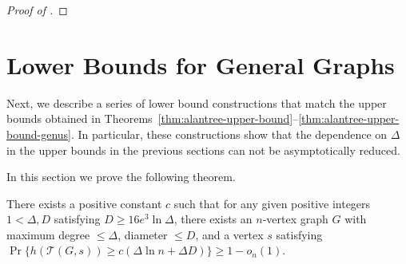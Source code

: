 \documentclass{patmorin}
\newcommand{\tcal}{\mathcal{T}}
\begin{document}
\begin{proof}[Proof of ]
\end{proof}



\section{Lower Bounds for General Graphs}

Next, we describe a series of lower bound
constructions that match the upper bounds obtained in
Theorems~\ref{thm:alantree-upper-bound}--\ref{thm:alantree-upper-bound-genus}.
In particular, these constructions show that the dependence on $\Delta$
in the upper bounds in the previous sections can not be asymptotically
reduced.

In this section we prove the following theorem.

\begin{thm}
There exists a positive constant $c$ such that 
for any given positive integers $1<\Delta, D$ satisfying
$D\geq 16e^3 \ln \Delta$,
there exists an $n$-vertex graph $G$ with 
maximum degree $\leq \Delta$,
diameter $\leq D$, and
a vertex $s$ satisfying
$\Pr\{h(\tcal(G,s)) \geq c(\Delta \ln n + \Delta D)\}\geq 1-o_n(1)$.
\end{thm}
\end{document}
